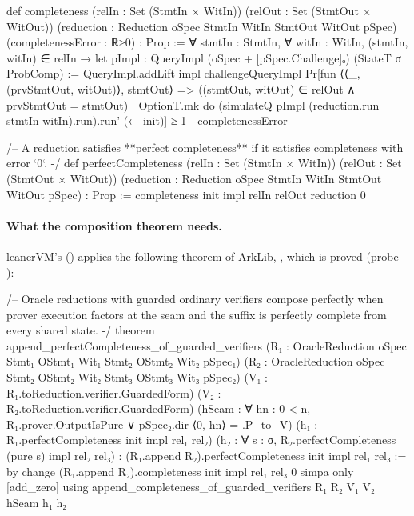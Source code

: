 \begin{leancode}
def completeness (relIn : Set (StmtIn × WitIn))
    (relOut : Set (StmtOut × WitOut))
    (reduction : Reduction oSpec StmtIn WitIn StmtOut WitOut pSpec)
    (completenessError : ℝ≥0) : Prop :=
  ∀ stmtIn : StmtIn,
  ∀ witIn : WitIn,
  (stmtIn, witIn) ∈ relIn →
    let pImpl : QueryImpl (oSpec + [pSpec.Challenge]ₒ) (StateT σ ProbComp) :=
      QueryImpl.addLift impl challengeQueryImpl
    Pr[fun ⟨⟨_, (prvStmtOut, witOut)⟩, stmtOut⟩ =>
        ((stmtOut, witOut) ∈ relOut ∧ prvStmtOut = stmtOut) | OptionT.mk do
          (simulateQ pImpl (reduction.run stmtIn witIn).run).run' (← init)] ≥ 1 - completenessError

/-- A reduction satisfies **perfect completeness** if it satisfies completeness with error `0`. -/
def perfectCompleteness (relIn : Set (StmtIn × WitIn)) (relOut : Set (StmtOut × WitOut))
    (reduction : Reduction oSpec StmtIn WitIn StmtOut WitOut pSpec) : Prop :=
  completeness init impl relIn relOut reduction 0
\end{leancode}


\paragraph{What the composition theorem needs.} leanerVM's 
() applies the following theorem of ArkLib,
\allowbreak{}\allowbreak{}\allowbreak{}\allowbreak{}, which is proved (probe
):

\begin{leancode}
/-- Oracle reductions with guarded ordinary verifiers compose perfectly when prover execution
factors at the seam and the suffix is perfectly complete from every shared state. -/
theorem append_perfectCompleteness_of_guarded_verifiers
    (R₁ : OracleReduction oSpec Stmt₁ OStmt₁ Wit₁ Stmt₂ OStmt₂ Wit₂ pSpec₁)
    (R₂ : OracleReduction oSpec Stmt₂ OStmt₂ Wit₂ Stmt₃ OStmt₃ Wit₃ pSpec₂)
    (V₁ : R₁.toReduction.verifier.GuardedForm) (V₂ : R₂.toReduction.verifier.GuardedForm)
    (hSeam : ∀ hn : 0 < n,
      R₁.prover.OutputIsPure ∨ pSpec₂.dir ⟨0, hn⟩ = .P_to_V)
    (h₁ : R₁.perfectCompleteness init impl rel₁ rel₂)
    (h₂ : ∀ s : σ, R₂.perfectCompleteness (pure s) impl rel₂ rel₃) :
    (R₁.append R₂).perfectCompleteness init impl rel₁ rel₃ := by
  change (R₁.append R₂).completeness init impl rel₁ rel₃ 0
  simpa only [add_zero] using
    append_completeness_of_guarded_verifiers R₁ R₂ V₁ V₂ hSeam h₁ h₂
\end{leancode}

